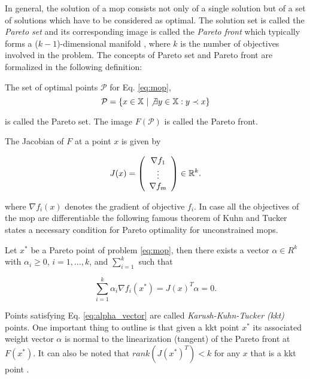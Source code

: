 In general, the solution of a \gls{mop} consists not only of a single solution but of a set of solutions which have to be considered as optimal. The solution set is called the \emph{Pareto set} and its corresponding image is called the \emph{Pareto front} which typically forms a ($k-1$)-dimensional manifold \cite{hillermeier01}, where $k$ is the number of objectives involved in the problem. The concepts of Pareto set and Pareto front are formalized in the following definition:

\begin{mydef}
The set of optimal points $\mathcal{P}$ for Eq. \eqref{eq:mop}, 
\[
\mathcal{P} = \{ x \in \mathbb{X} \ |\not \exists y  \in \mathbb{X} : y \prec x \}
\]

\noindent is called the Pareto set. The image $F(\mathcal{P})$ is called the Pareto front.
\end{mydef}

The Jacobian of $F$ at a point $x$ is given by 

\begin{equation}
J(x) = \left(\begin{array}[]{c}\nabla f_{1}\\
\vdots\\
\nabla f_{m}\end{array}\right) \in \mathbb{R}^k.
\label{eq:jacobian}
\end{equation}

where $\nabla f_i(x)$ denotes the gradient of objective $f_i$. In case all the objectives of the \gls{mop} are differentiable the following famous theorem of Kuhn and Tucker \cite{kkt_conditions} states a necessary condition for Pareto optimality for unconstrained \glspl{mop}.

\begin{theorem}
\label{theo:kkt_cond}
Let $x^*$ be a Pareto point of problem \ref{eq:mop}, then there exists a vector $\alpha \in R^k$ with $\alpha_i \geq 0$, $i = 1,\ldots,k$, and $\sum_{i = 1}^k$ such that

\begin{equation}
\sum_{i = 1}^k \alpha_i \nabla f_i(x^*) = J(x)^T \alpha = 0.
\label{eq:alpha_vector}
\end{equation}
\end{theorem}

Points satisfying Eq. \ref{eq:alpha_vector} are called \emph{Karush-Kuhn-Tucker (\gls{kkt})} points. One important thing to outline is that given a \gls{kkt} point $x^*$ its associated weight vector $\alpha$ is normal to the linearization (tangent) of the Pareto front at $F(x^*)$. It can also be noted that $rank (J(x^*)^T) < k$ for any $x$ that is a \gls{kkt} point \cite{hillermeier01}.

